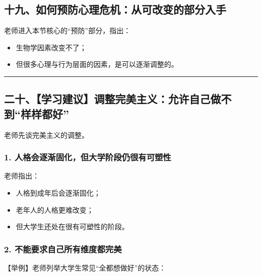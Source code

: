 \documentclass[
  chinese,
  9pt,
  a4paper,
]{ctexart}
\providecommand{\tightlist}{%
  \setlength{\itemsep}{0pt}\setlength{\parskip}{0pt}}
\begin{document}
\subsection{十九、如何预防心理危机：从可改变的部分入手}\label{ux5341ux4e5dux5982ux4f55ux9884ux9632ux5fc3ux7406ux5371ux673aux4eceux53efux6539ux53d8ux7684ux90e8ux5206ux5165ux624b}

老师进入本节核心的``预防''部分，指出：

\begin{itemize}
\tightlist
\item
  生物学因素改变不了；
\item
  但很多心理与行为层面的因素，是可以逐渐调整的。
\end{itemize}

\begin{center}\rule{0.5\linewidth}{0.5pt}\end{center}

\subsection{二十、【学习建议】调整完美主义：允许自己做不到``样样都好''}\label{ux4e8cux5341ux5b66ux4e60ux5efaux8baeux8c03ux6574ux5b8cux7f8eux4e3bux4e49ux5141ux8bb8ux81eaux5df1ux505aux4e0dux5230ux6837ux6837ux90fdux597d}

老师先谈完美主义的调整。

\subsubsection{1.
人格会逐渐固化，但大学阶段仍很有可塑性}\label{ux4ebaux683cux4f1aux9010ux6e10ux56faux5316ux4f46ux5927ux5b66ux9636ux6bb5ux4ecdux5f88ux6709ux53efux5851ux6027}

老师指出：

\begin{itemize}
\tightlist
\item
  人格到成年后会逐渐固化；
\item
  老年人的人格更难改变；
\item
  但大学生还处在很有可塑性的阶段。
\end{itemize}

\subsubsection{2.
不能要求自己所有维度都完美}\label{ux4e0dux80fdux8981ux6c42ux81eaux5df1ux6240ux6709ux7ef4ux5ea6ux90fdux5b8cux7f8e}

【举例】老师列举大学生常见``全都想做好''的状态：
\end{document}
